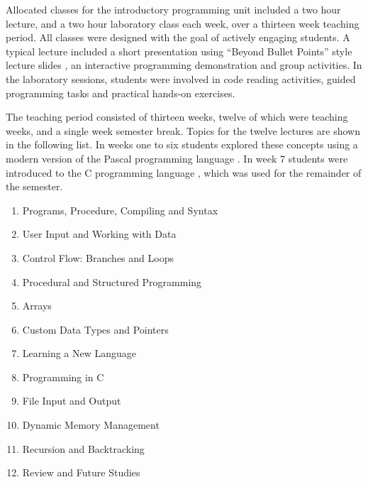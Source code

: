 Allocated classes for the introductory programming unit included a two hour lecture, and a two hour laboratory class each week, over a thirteen week teaching period. All classes were designed with the goal of actively engaging students. A typical lecture included a short presentation using ``Beyond Bullet Points'' style lecture slides \cite{Atkinson:2007}, an interactive programming demonstration and group activities. In the laboratory sessions, students were involved in code reading activities, guided programming tasks and practical hands-on exercises.

The teaching period consisted of thirteen weeks, twelve of which were teaching weeks, and a single week semester break. Topics for the twelve lectures are shown in the following list. In weeks one to six students explored these concepts using a modern version of the Pascal programming language \cite{Wirth:1971,FPC:2011}. In week 7 students were introduced to the C programming language \cite{Ritchie:1978}, which was used for the remainder of the semester. 

\begin{enumerate}
  \item Programs, Procedure, Compiling and Syntax
  \item User Input and Working with Data
  \item Control Flow: Branches and Loops
  \item Procedural and Structured Programming
  \item Arrays
  \item Custom Data Types and Pointers
  \item Learning a New Language
  \item Programming in C
  \item File Input and Output
  \item Dynamic Memory Management
  \item Recursion and Backtracking
  \item Review and Future Studies
\end{enumerate}



